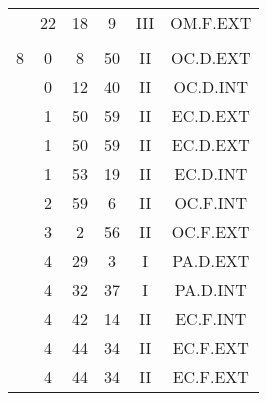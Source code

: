 \documentclass[12pt, a4paper]{article}
\begin{document}
\begin{multicols}{3}
{\begin{tabular}{c c c c c c}
	 	 	 	 & 22 & 18 & 9 & III & OM.F.EXT\\%
	 	 	 	 & & & & & \\%
	 	 	 	8 & 0 & 8 & 50 & II & OC.D.EXT\\%
	 	 	 	 & 0 & 12 & 40 & II & OC.D.INT\\%
	 	 	 	 & 1 & 50 & 59 & II & EC.D.EXT\\%
	 	 	 	 & 1 & 50 & 59 & II & EC.D.EXT\\%
	 	 	 	 & 1 & 53 & 19 & II & EC.D.INT\\%
	 	 	 	 & 2 & 59 & 6 & II & OC.F.INT\\%
	 	 	 	 & 3 & 2 & 56 & II & OC.F.EXT\\%
	 	 	 	 & 4 & 29 & 3 & I & PA.D.EXT\\%
	 	 	 	 & 4 & 32 & 37 & I & PA.D.INT\\%
	 	 	 	 & 4 & 42 & 14 & II & EC.F.INT\\%
	 	 	 	 & 4 & 44 & 34 & II & EC.F.EXT\\%
	 	 	 	 & 4 & 44 & 34 & II & EC.F.EXT\\%
	 	 \end{tabular}
 	}
\end{multicols}
\end{document}
